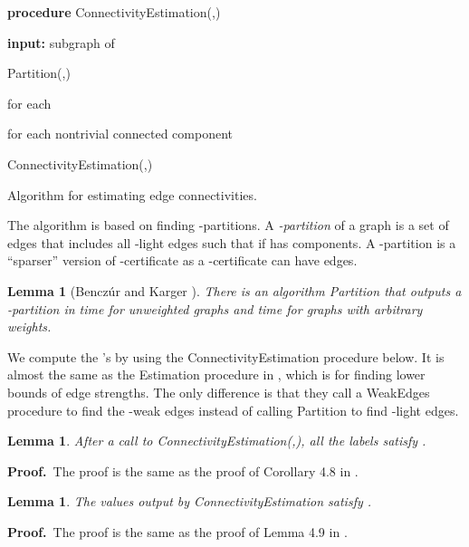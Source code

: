 \documentclass[11pt]{article}
\newcommand{\proofbelow}{8pt}
\numberwithin{equation}{section}
\newenvironment{alg}{
    \begin{list}{}{
        \setlength{\itemsep}{2pt}
        \setlength{\parsep}{0pt}
        \setlength{\parskip}{0pt}
        \setlength{\topsep}{1pt}
    }
}
{
    \end{list}
}
\newtheorem{lemma}[theorem]{Lemma}
\renewenvironment{proof}{\noindent\textbf{Proof.}\,}{\afterproof}
\newcommand{\afterproof}{\hfill  \par \vspace{\proofbelow}}
\newcommand{\AlgorithmName}[1]{\label{alg:#1}}
\begin{document}
\begin{algorithm}
\begin{alg}
	\item	\textbf{procedure} ConnectivityEstimation(,)
	\item	\textbf{input:} subgraph  of 
	\item	 Partition(,)
	\item	for each 
        \begin{alg}
        \item	
        \end{alg}
	\item	for each nontrivial connected component 
        \begin{alg}
    	\item	ConnectivityEstimation(,)
        \end{alg}
\end{alg}
\caption{Algorithm for estimating edge connectivities.}
\AlgorithmName{connest}
\end{algorithm}

The algorithm is based on finding -partitions.
A \emph{-partition} of a graph 
is a set  of edges that includes all -light edges
such that  if  has  components.
A -partition is a ``sparser'' version of -certificate
as a -certificate can have  edges.

\begin{lemma}[Bencz\'ur and Karger \cite{BK}]
\label{alg:partition}
There is an algorithm Partition that outputs 
a -partition in  time for unweighted graphs
and  time for graphs with arbitrary weights.
\end{lemma}

We compute the 's by using the ConnectivityEstimation procedure below.
It is almost the same as the Estimation procedure in \cite{BK},
which is for finding lower bounds of edge strengths.
The only difference is that they call a WeakEdges procedure
to find the -weak edges
instead of calling Partition to find -light edges.

\begin{lemma}
After a call to ConnectivityEstimation(,),
all the labels  satisfy .
\end{lemma}
\begin{proof}
The proof is the same as the proof of Corollary 4.8 in \cite{BK}.
\end{proof}

\begin{lemma}
\label{lem:sumKappa}
The values  output by ConnectivityEstimation satisfy .
\end{lemma}
\begin{proof}
The proof is the same as the proof of Lemma 4.9 in \cite{BK}.
\end{proof} 
\end{document}
